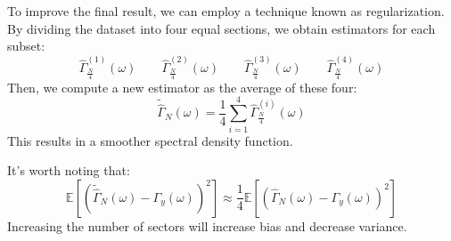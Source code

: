To improve the final result, we can employ a technique known as regularization. 
By dividing the dataset into four equal sections, we obtain estimators for each subset:
\[\hat{\Gamma}_{\frac{N}{4}}^{(1)}(\omega) \qquad \hat{\Gamma}_{\frac{N}{4}}^{(2)}(\omega) \qquad \hat{\Gamma}_{\frac{N}{4}}^{(3)}(\omega) \qquad \hat{\Gamma}_{\frac{N}{4}}^{(4)}(\omega)\]
Then, we compute a new estimator as the average of these four:
\[\tilde{\hat{\Gamma}}_N(\omega)=\dfrac{1}{4}\sum_{i=1}^{4}\hat{\Gamma}_{\frac{N}{4}}^{(i)}(\omega)\]
This results in a smoother spectral density function.

It's worth noting that:
\[\mathbb{E}\left[\left(\tilde{\hat{\Gamma}}_N(\omega)-\Gamma_y(\omega)\right)^2\right] \approx \dfrac{1}{4}\mathbb{E}\left[\left(\hat{\Gamma}_N(\omega)-\Gamma_y(\omega)\right)^2\right]\]
Increasing the number of sectors will increase bias and decrease variance.